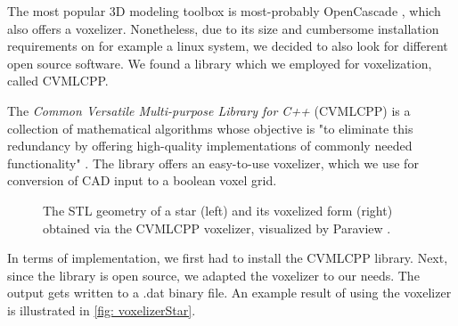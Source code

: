 The most popular 3D modeling toolbox is most-probably OpenCascade \cite{OpenCascade}, which also offers a voxelizer. Nonetheless, due to its size and cumbersome installation requirements on for example a linux system, we decided to also look for different open source software. We found a library which we employed for voxelization, called CVMLCPP.


The \emph{Common Versatile Multi-purpose Library for C++} (CVMLCPP) is a collection of mathematical algorithms whose objective is "to eliminate this redundancy by offering high-quality implementations of commonly needed functionality" \cite{CVMLCPP}. The library offers an easy-to-use voxelizer, which we use for conversion of CAD input to a boolean voxel grid.

\begin{figure}
\centering
\begin{subfigure}{
  \texttt{[image: Pictures/STLToVoxels/Star\_STL.png]}}
\end{subfigure}
\begin{subfigure}{
  \texttt{[image: Pictures/STLToVoxels/Star\_VTK\_Trans.png]}}
\end{subfigure}
\caption{The STL geometry of a star (left) and its voxelized form (right) obtained via the CVMLCPP voxelizer, visualized by Paraview \cite{Paraview}.}
\label{fig: voxelizerStar}
\end{figure}

In terms of implementation, we first had to install the CVMLCPP library. Next, since the library is open source, we adapted the voxelizer to our needs. %
The output gets written to a .dat binary file. An example result of using the voxelizer is illustrated in \autoref{fig: voxelizerStar}.